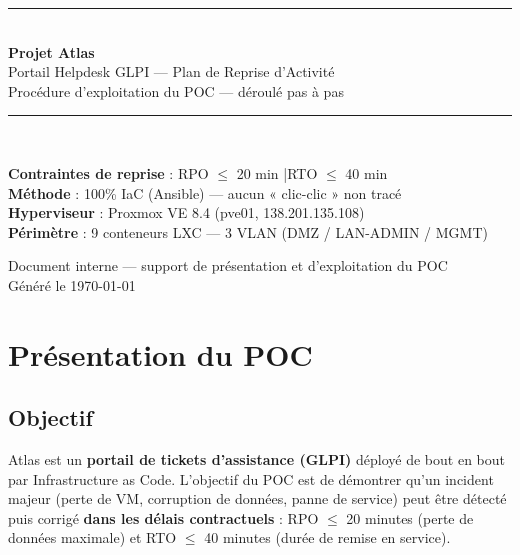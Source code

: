 \documentclass[11pt,a4paper]{article}
\begin{document}
\begin{titlepage}
\centering
\vspace*{2cm}
{\color{atlasblue}\rule{\linewidth}{2pt}}\\[0.6cm]
{\Huge\bfseries\color{atlasdark} Projet Atlas}\\[0.35cm]
{\LARGE Portail Helpdesk GLPI — Plan de Reprise d'Activité}\\[0.25cm]
{\large\color{codecom} Procédure d'exploitation du POC — déroulé pas à pas}\\[0.4cm]
{\color{atlasblue}\rule{\linewidth}{2pt}}\\[1.4cm]

\begin{tcolorbox}[width=0.85\linewidth,colback=atlasgray,colframe=atlasdark,sharp corners]
\centering\small
\textbf{Contraintes de reprise} : RPO $\leq$ 20 min \quad|\quad RTO $\leq$ 40 min\\[2pt]
\textbf{Méthode} : 100\% IaC (Ansible) — aucun « clic-clic » non tracé\\[2pt]
\textbf{Hyperviseur} : Proxmox VE 8.4 (pve01, 138.201.135.108)\\[2pt]
\textbf{Périmètre} : 9 conteneurs LXC — 3 VLAN (DMZ / LAN-ADMIN / MGMT)
\end{tcolorbox}

\vfill
{\color{codecom}\small Document interne — support de présentation et d'exploitation du POC}\\
{\color{codecom}\small Généré le \today}
\end{titlepage}

\tableofcontents
\newpage

\section{Présentation du POC}

\subsection{Objectif}
Atlas est un \textbf{portail de tickets d'assistance (GLPI)} déployé de bout en bout par
Infrastructure as Code. L'objectif du POC est de démontrer qu'un incident majeur
(perte de VM, corruption de données, panne de service) peut être détecté puis corrigé
\textbf{dans les délais contractuels} : RPO $\leq$ 20 minutes (perte de données maximale)
et RTO $\leq$ 40 minutes (durée de remise en service).
\end{document}
